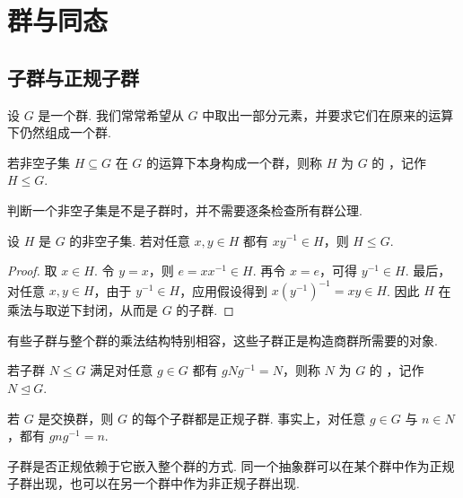 
\chapter{群与同态}
\section{子群与正规子群}


设 \(G\) 是一个群.
我们常常希望从 \(G\) 中取出一部分元素，并要求它们在原来的运算下仍然组成一个群.

\begin{definition}\label{def:subgroup}
若非空子集 \(H\subseteq G\) 在 \(G\) 的运算下本身构成一个群，则称 \(H\) 为 \(G\) 的 ，记作 \(H\leq G\).
\end{definition}

判断一个非空子集是不是子群时，并不需要逐条检查所有群公理.

\begin{lemma}\label{lem:subgroup-test}
设 \(H\) 是 \(G\) 的非空子集.
若对任意 \(x,y\in H\) 都有 \(xy^{-1}\in H\)，则 \(H\leq G\).
\end{lemma}

\begin{proof}
取 \(x\in H\).
令 \(y=x\)，则 \(e=xx^{-1}\in H\).
再令 \(x=e\)，可得 \(y^{-1}\in H\).
最后，对任意 \(x,y\in H\)，由于 \(y^{-1}\in H\)，应用假设得到 \(x(y^{-1})^{-1}=xy\in H\).
因此 \(H\) 在乘法与取逆下封闭，从而是 \(G\) 的子群.
\end{proof}

有些子群与整个群的乘法结构特别相容，这些子群正是构造商群所需要的对象.

\begin{definition}\label{def:normal-subgroup}
若子群 \(N\leq G\) 满足对任意 \(g\in G\) 都有 \(gNg^{-1}=N\)，则称 \(N\) 为 \(G\) 的 ，记作 \(N\trianglelefteq G\).
\end{definition}

\begin{example}\label{ex:abelian-normal}
若 \(G\) 是交换群，则 \(G\) 的每个子群都是正规子群.
事实上，对任意 \(g\in G\) 与 \(n\in N\)，都有 \(gng^{-1}=n\).
\end{example}

\begin{remark}\label{rem:normal}
子群是否正规依赖于它嵌入整个群的方式.
同一个抽象群可以在某个群中作为正规子群出现，也可以在另一个群中作为非正规子群出现.
\end{remark}

